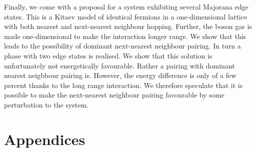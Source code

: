 \documentclass[11pt, twoside]{Thesis}
\begin{document}
Finally, we come with a proposal for a system exhibiting several Majorana edge states. This is a Kitaev model of identical fermions in a one-dimensional lattice with both nearest and next-nearest neighbour hopping. Further, the boson gas is made one-dimensional to make the interaction longer range. We show that this leads to the possibility of dominant next-nearest neighbour pairing. In turn a phase with two edge states is realised. We show that this solution is unfortunately not energetically favourable. Rather a pairing with dominant nearest neigbbour pairing is. However, the energy difference is only of a few percent thanks to the long range interaction. We therefore speculate that it is possible to make the next-nearest neighbour pairing favourable by some perturbation to the system. 

\newpage 


\part{Appendices}

\appendix %













\backmatter


\label{Bibliography}

\chead{}
\printbibliography
\end{document}
